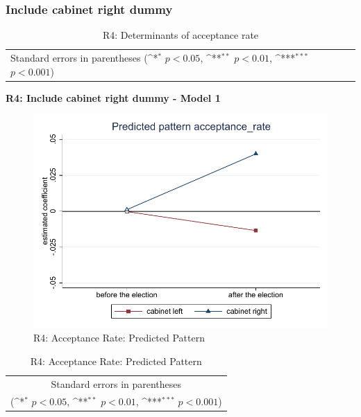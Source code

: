 \documentclass[10pt,a4paper]{scrartcl}
\begin{document}


\clearpage
\FloatBarrier
\subsubsection{Include cabinet right dummy}
\begin{table}[!ht]\centering
	\renewcommand{\arraystretch}{1.25}
	\small
	\def\sym#1{\ifmmode^{#1}\else\(^{#1}\)\fi}
	\caption{R4: Determinants of acceptance rate}
	\begin{tabular}{l*{3}{c}}
		\hline\hline
		
		\hline\hline
		\multicolumn{4}{l}{\footnotesize Standard errors in parentheses (\sym{*} \(p<0.05\), \sym{**} \(p<0.01\), \sym{***} \(p<0.001\))}\\
	\end{tabular}
\end{table}

\clearpage
\textbf{R4: Include cabinet right dummy - Model 1}
\begin{figure}[!ht]
	\centering
	\includegraphics[width=1\textwidth]{figures_edited/acceptance_rate_graph1_R4.pdf}
	\caption{R4: Acceptance Rate: Predicted Pattern}
\end{figure}

\begin{table}[!ht]\centering
	\renewcommand{\arraystretch}{1.25}
	\def\sym#1{\ifmmode^{#1}\else\(^{#1}\)\fi}
	\caption{R4: Acceptance Rate: Predicted Pattern}
	\begin{tabular}{l*{2}{c}}
		\hline\hline
		
		\hline\hline
		\multicolumn{3}{c}{\footnotesize Standard errors in parentheses} \\
		\multicolumn{3}{c}{\footnotesize (\sym{*} \(p<0.05\), \sym{**} \(p<0.01\), \sym{***} \(p<0.001\))}\\
	\end{tabular}
\end{table}
\end{document}

